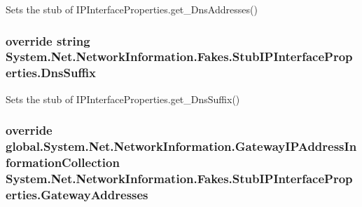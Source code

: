 Sets the stub of I\-P\-Interface\-Properties.\-get\-\_\-\-Dns\-Addresses()

\hypertarget{class_system_1_1_net_1_1_network_information_1_1_fakes_1_1_stub_i_p_interface_properties_a9fbb04f62687f312af8669a34e7a0c19}{
\subsubsection[{Dns\-Suffix}]{\setlength{\rightskip}{0pt plus 5cm}override string System.\-Net.\-Network\-Information.\-Fakes.\-Stub\-I\-P\-Interface\-Properties.\-Dns\-Suffix\hspace{0.3cm}{\ttfamily [get]}}}\label{class_system_1_1_net_1_1_network_information_1_1_fakes_1_1_stub_i_p_interface_properties_a9fbb04f62687f312af8669a34e7a0c19}


Sets the stub of I\-P\-Interface\-Properties.\-get\-\_\-\-Dns\-Suffix()

\hypertarget{class_system_1_1_net_1_1_network_information_1_1_fakes_1_1_stub_i_p_interface_properties_a63bdff3d0d3daba58003b28c9e8696b5}{
\subsubsection[{Gateway\-Addresses}]{\setlength{\rightskip}{0pt plus 5cm}override global.\-System.\-Net.\-Network\-Information.\-Gateway\-I\-P\-Address\-Information\-Collection System.\-Net.\-Network\-Information.\-Fakes.\-Stub\-I\-P\-Interface\-Properties.\-Gateway\-Addresses\hspace{0.3cm}{\ttfamily [get]}}}\label{class_system_1_1_net_1_1_network_information_1_1_fakes_1_1_stub_i_p_interface_properties_a63bdff3d0d3daba58003b28c9e8696b5}


